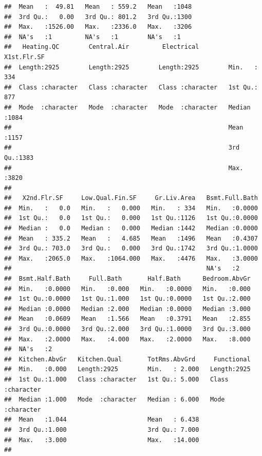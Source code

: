 \documentclass[
]{article}
\begin{document}
\begin{verbatim}
##  Mean   :  49.81   Mean   : 559.2   Mean   :1048                     
##  3rd Qu.:   0.00   3rd Qu.: 801.2   3rd Qu.:1300                     
##  Max.   :1526.00   Max.   :2336.0   Max.   :3206                     
##  NA's   :1         NA's   :1        NA's   :1                        
##   Heating.QC        Central.Air         Electrical         X1st.Flr.SF  
##  Length:2925        Length:2925        Length:2925        Min.   : 334  
##  Class :character   Class :character   Class :character   1st Qu.: 877  
##  Mode  :character   Mode  :character   Mode  :character   Median :1084  
##                                                           Mean   :1157  
##                                                           3rd Qu.:1383  
##                                                           Max.   :3820  
##                                                                         
##   X2nd.Flr.SF     Low.Qual.Fin.SF     Gr.Liv.Area   Bsmt.Full.Bath  
##  Min.   :   0.0   Min.   :   0.000   Min.   : 334   Min.   :0.0000  
##  1st Qu.:   0.0   1st Qu.:   0.000   1st Qu.:1126   1st Qu.:0.0000  
##  Median :   0.0   Median :   0.000   Median :1442   Median :0.0000  
##  Mean   : 335.2   Mean   :   4.685   Mean   :1496   Mean   :0.4307  
##  3rd Qu.: 703.0   3rd Qu.:   0.000   3rd Qu.:1742   3rd Qu.:1.0000  
##  Max.   :2065.0   Max.   :1064.000   Max.   :4476   Max.   :3.0000  
##                                                     NA's   :2       
##  Bsmt.Half.Bath     Full.Bath       Half.Bath      Bedroom.AbvGr  
##  Min.   :0.0000   Min.   :0.000   Min.   :0.0000   Min.   :0.000  
##  1st Qu.:0.0000   1st Qu.:1.000   1st Qu.:0.0000   1st Qu.:2.000  
##  Median :0.0000   Median :2.000   Median :0.0000   Median :3.000  
##  Mean   :0.0609   Mean   :1.566   Mean   :0.3791   Mean   :2.855  
##  3rd Qu.:0.0000   3rd Qu.:2.000   3rd Qu.:1.0000   3rd Qu.:3.000  
##  Max.   :2.0000   Max.   :4.000   Max.   :2.0000   Max.   :8.000  
##  NA's   :2                                                        
##  Kitchen.AbvGr   Kitchen.Qual       TotRms.AbvGrd     Functional       
##  Min.   :0.000   Length:2925        Min.   : 2.000   Length:2925       
##  1st Qu.:1.000   Class :character   1st Qu.: 5.000   Class :character  
##  Median :1.000   Mode  :character   Median : 6.000   Mode  :character  
##  Mean   :1.044                      Mean   : 6.438                     
##  3rd Qu.:1.000                      3rd Qu.: 7.000                     
##  Max.   :3.000                      Max.   :14.000                     
##                                                                        

\end{verbatim}
\end{document}
